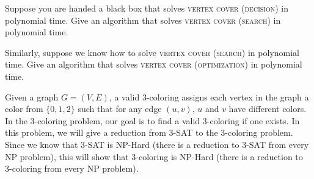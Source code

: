 \documentclass{article}
\begin{document}
	\begin{subparts}
		\subpart Suppose you are handed a black box that solves \textsc{vertex cover (decision)} in polynomial time. Give an algorithm that solves \textsc{vertex cover (search)} in polynomial time.

		\subpart Similarly, suppose we know how to solve \textsc{vertex cover (search)} in polynomial time. Give an algorithm that solves \textsc{vertex cover (optimization)} in polynomial time.

	\end{subparts}





Given a graph $G = (V, E)$, a valid 3-coloring assigns each vertex in the graph a color from $\{0, 1, 2\}$ such that for any edge $(u, v)$, $u$ and $v$ have different colors. In the 3-coloring problem, our goal is to find a valid 3-coloring if one exists. In this problem, we will give a reduction from 3-SAT to the 3-coloring problem. Since we know that 3-SAT is NP-Hard (there is a reduction to 3-SAT from every NP problem), this will show that 3-coloring is NP-Hard (there is a reduction to 3-coloring from every NP problem).
\end{document}
